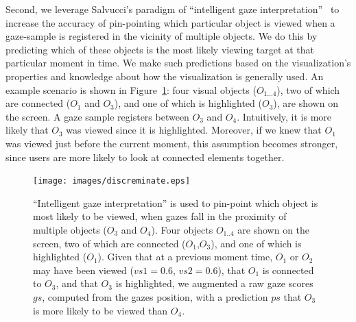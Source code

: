 Second, we leverage Salvucci's paradigm of ``intelligent gaze interpretation''~\cite{salvucci2000intelligent} to increase the accuracy of pin-pointing which particular object is viewed when a gaze-sample is registered in the vicinity of multiple objects. We do this by predicting which of these objects is the most likely viewing target at that particular moment in time. We make such predictions based on the visualization's properties and knowledge about how the visualization is generally used. An example scenario is shown in Figure~\ref{fig:discreminate}: four visual objects ($O_{1\ldots 4}$), two of which are connected ($O_1$ and $O_3$), and one of which is highlighted ($O_3$), are shown on the screen. A gaze sample registers between $O_3$ and $O_4$. Intuitively, it is more likely that $O_3$ was viewed since it is highlighted. Moreover, if we knew that $O_1$ was viewed just before the current moment, this assumption becomes stronger, since users are more likely to look at connected elements together. 

\begin{figure}[htb]
  \centering
  \texttt{[image: images/discreminate.eps]}
  \caption{``Intelligent gaze interpretation'' is used to pin-point which object is most likely to be viewed, when gazes fall in the proximity of multiple objects ($O_3$ and $O_4$). Four objects $O_{1..4}$ are shown on the screen, two of which are connected ($O_1$,$O_3$), and one of which is highlighted ($O_1$). Given that at a previous moment time, $O_1$ or $O_2$ may have been viewed ($vs1 = 0.6$, $vs2=0.6$), that $O_1$ is connected to $O_3$, and that $O_3$ is highlighted, we augmented a raw gaze scores $gs$, computed from the gazes position, with  a prediction $ps$ that $O_3$ is more likely to be viewed than $O_4$.}
	\label{fig:discreminate}
\end{figure}

